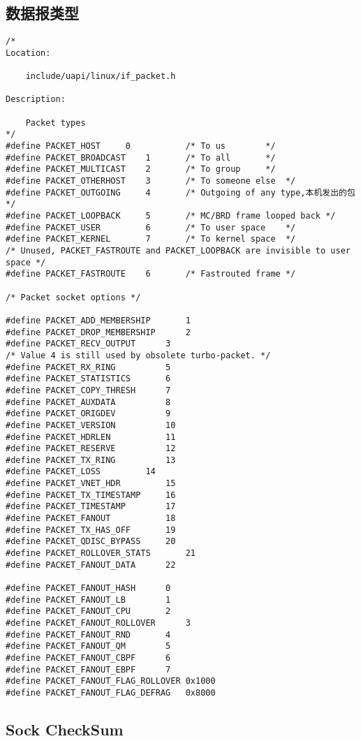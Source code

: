         \subsection{数据报类型}
\begin{verbatim}
/* 
Location:

    include/uapi/linux/if_packet.h

Description:

    Packet types 
*/
#define PACKET_HOST     0           /* To us        */
#define PACKET_BROADCAST    1       /* To all       */
#define PACKET_MULTICAST    2       /* To group     */
#define PACKET_OTHERHOST    3       /* To someone else  */
#define PACKET_OUTGOING     4       /* Outgoing of any type,本机发出的包 */
#define PACKET_LOOPBACK     5       /* MC/BRD frame looped back */
#define PACKET_USER         6       /* To user space    */
#define PACKET_KERNEL       7       /* To kernel space  */
/* Unused, PACKET_FASTROUTE and PACKET_LOOPBACK are invisible to user space */
#define PACKET_FASTROUTE    6       /* Fastrouted frame */

/* Packet socket options */

#define PACKET_ADD_MEMBERSHIP       1
#define PACKET_DROP_MEMBERSHIP      2
#define PACKET_RECV_OUTPUT      3
/* Value 4 is still used by obsolete turbo-packet. */
#define PACKET_RX_RING          5
#define PACKET_STATISTICS       6
#define PACKET_COPY_THRESH      7
#define PACKET_AUXDATA          8
#define PACKET_ORIGDEV          9
#define PACKET_VERSION          10
#define PACKET_HDRLEN           11
#define PACKET_RESERVE          12
#define PACKET_TX_RING          13
#define PACKET_LOSS         14
#define PACKET_VNET_HDR         15
#define PACKET_TX_TIMESTAMP     16
#define PACKET_TIMESTAMP        17
#define PACKET_FANOUT           18
#define PACKET_TX_HAS_OFF       19
#define PACKET_QDISC_BYPASS     20
#define PACKET_ROLLOVER_STATS       21
#define PACKET_FANOUT_DATA      22

#define PACKET_FANOUT_HASH      0
#define PACKET_FANOUT_LB        1
#define PACKET_FANOUT_CPU       2
#define PACKET_FANOUT_ROLLOVER      3
#define PACKET_FANOUT_RND       4
#define PACKET_FANOUT_QM        5
#define PACKET_FANOUT_CBPF      6
#define PACKET_FANOUT_EBPF      7
#define PACKET_FANOUT_FLAG_ROLLOVER 0x1000
#define PACKET_FANOUT_FLAG_DEFRAG   0x8000
\end{verbatim}    
        \subsection{Sock CheckSum}
